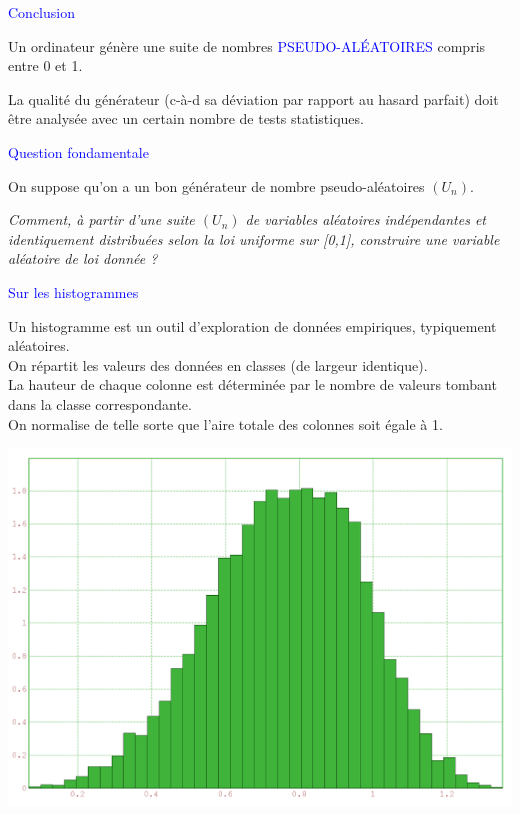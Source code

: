 \begin{Large}
\colorbox{gray!20}{\textcolor{blue}{Conclusion}}
\end{Large}

\begin{center}
Un ordinateur génère une suite de nombres {\textcolor{blue}{PSEUDO-ALÉATOIRES} compris entre 0 et 1.}
\end{center}

La qualité du générateur (c-à-d sa déviation par rapport au hasard parfait) doit être analysée avec un certain nombre de tests statistiques. \\

\begin{Large}
\hspace{2mm} \colorbox{gray!20}{\textcolor{blue}{Question fondamentale}}
\end{Large}

On suppose qu'on a un bon générateur de nombre
pseudo-aléatoires $(U_{n})$.

\begin{center}
\textit{Comment, à partir d'une suite $(U_{n})$ de variables aléatoires indépendantes et identiquement distribuées selon la loi uniforme sur [0,1], construire une variable aléatoire de loi donnée ?}\\
\end{center}


\begin{Large}
\hspace{2mm} \colorbox{gray!20}{\textcolor{blue}{Sur les histogrammes}}
\end{Large}

Un histogramme est un outil d'exploration de données empiriques, typiquement aléatoires.\\
On répartit les valeurs des données en classes (de largeur identique).\\
La hauteur de chaque colonne est déterminée par le nombre de valeurs tombant dans la classe correspondante.\\
On normalise de telle sorte que l'aire totale des colonnes soit égale à 1.\\
\begin{center}
\includegraphics[scale=0.6]{content/Figure1.PNG} \\
\end{center}

